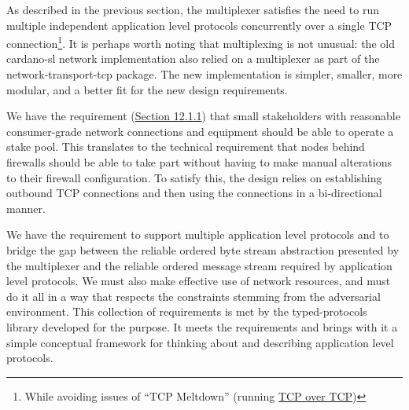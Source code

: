 \documentclass[11pt,a4paper]{article}
\begin{document}
As described in the previous section, the multiplexer satisfies the need
to run multiple independent application level protocols concurrently
over a single TCP connection\footnote{While avoiding issues of ``TCP
  Meltdown'' (running
  \href{https://en.wikipedia.org/wiki/Tunneling_protocol\#Secure_Shell_tunneling}{{TCP
  over TCP}})}. It is perhaps worth noting that multiplexing is not
unusual: the old cardano-sl network implementation also relied on a
multiplexer as part of the network-transport-tcp package. The new
implementation is simpler, smaller, more modular, and a better fit for
the new design requirements.

We have the requirement
(\protect\hyperlink{network-connectivity}{{Section 12.1.1}}) that small
stakeholders with reasonable consumer-grade network connections and
equipment should be able to operate a stake pool. This translates to the
technical requirement that nodes behind firewalls should be able to take
part without having to make manual alterations to their firewall
configuration. To satisfy this, the design relies on establishing
outbound TCP connections and then using the connections in a
bi-directional manner.

We have the requirement to support multiple application level protocols
and to bridge the gap between the reliable ordered byte stream
abstraction presented by the multiplexer and the reliable ordered
message stream required by application level protocols. We must also
make effective use of network resources, and must do it all in a way
that respects the constraints stemming from the adversarial environment.
This collection of requirements is met by the typed-protocols library
developed for the purpose. It meets the requirements and brings with it
a simple conceptual framework for thinking about and describing
application level protocols.
\end{document}
